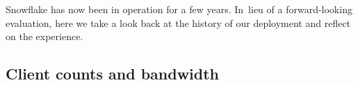 \documentclass[letterpaper,twocolumn]{article}
\begin{document}
Snowflake has now been in operation for a few years.
In~lieu of a forward-looking evaluation,
here we take a look back
at the history of our deployment
and reflect on the experience.

\subsection{Client counts and bandwidth}
\label{sec:clients}

\end{document}
